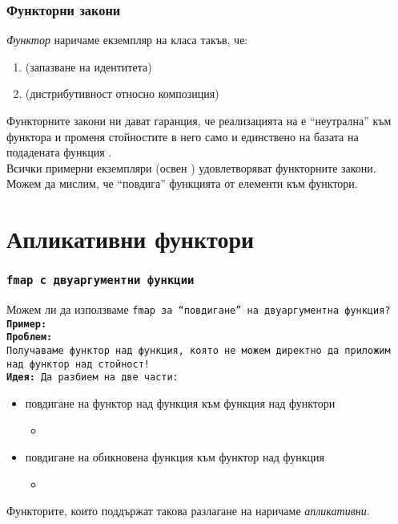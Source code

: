\documentclass[alsotrans,beameroptions={aspectratio=169}]{beamerswitch}
\begin{document}
\begin{frame}
  \frametitle{Функторни закони}
  \begin{definition}
    \emph{Функтор} наричаме екземпляр на класа  такъв, че:
    \begin{enumerate}
    \item {} \eqv {} (запазване на идентитета)
    \item {} \eqv {} (дистрибутивност относно композиция)
    \end{enumerate}
  \end{definition}
  \pause
  Функторните закони ни дават гаранция, че реализацията на  е ``неутрална'' към функтора и променя стойностите в него само и единствено на базата на подадената функция .\\
  \pause
  Всички примерни екземпляри (освен ) удовлетворяват функторните закони.\\
  \pause
  Можем да мислим, че  ``повдига'' функцията  от елементи към функтори.
\end{frame}

\section{Апликативни функтори}

\begin{frame}
  \frametitle{\tt{fmap} с двуаргументни функции}
  Можем ли да използваме \tt{fmap} за ``повдигане'' на двуаргументна функция?\\
  \pause
  \onslide<+->
  \textbf{Пример:} \\
  \onslide<+->
  \textbf{Проблем:} \\
  \onslide<+->
  Получаваме функтор над функция, която не можем директно да приложим над функтор над стойност!\\
  \onslide<+->
  \textbf{Идея:} Да разбием  на две части:
  \begin{itemize}[<+->]
  \item повдигане на функтор над функция към функция над функтори
    \begin{itemize}
    \item {}
    \end{itemize}
  \item повдигане на обикновена функция към функтор над функция
    \begin{itemize}
    \item {} 
    \end{itemize}
  \end{itemize}
  \onslide<+->
  Функторите, които поддържат такова разлагане на  наричаме \emph{апликативни}.
\end{frame}
\end{document}
